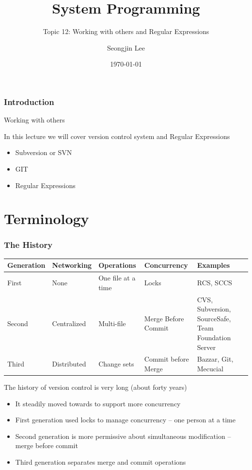 \documentclass[newPxFont,sthlmFooter,nooffset]{beamer}
\title{System Programming}
\subtitle{Topic 12: Working with others and Regular Expressions}
\author[SJL]{Seongjin Lee}
\institute{\href{mailto:insight@gnu.ac.kr}{insight@gnu.ac.kr}\\\url{http://open.gnu.ac.kr}\\Systems Research Lab.\\Gyeongsang National University}
\date{\today}
\begin{document}
\frame[plain]{\titlepage} 






\begin{frame}[t]
  \frametitle{Introduction}

Working with others 

In this lecture we will cover version control system and Regular Expressions
\begin{itemize}
\item Subversion or SVN
\item GIT
\item Regular Expressions
\end{itemize}
\end{frame}

\section{Terminology}

\begin{frame}[t]
  \frametitle{The History}
{\footnotesize
  \begin{table}[h]
    \centering
    \begin{tabular}{l | l | m{2cm} | m{2cm} | m{3cm}}
      Generation & Networking & Operations & Concurrency & Examples \\ \hline \hline
First & None & One file at a time & Locks & RCS, SCCS \\ \hline
Second & Centralized & Multi-file & Merge Before Commit & CVS, Subversion, SourceSafe, Team Foundation Server \\ \hline
Third & Distributed & Change sets & Commit before Merge & Bazzar, Git, Mecucial
    \end{tabular}
  \end{table}
}

The history of version control is very long (about forty years)
\begin{itemize}
\item It steadily moved towards to support more concurrency
\item First generation used locks to manage concurrency – one person at a time
\item Second generation is more permissive about simultaneous modification – merge before commit
\item Third generation separates merge and commit operations
\end{itemize}
\end{frame}
\end{document}
